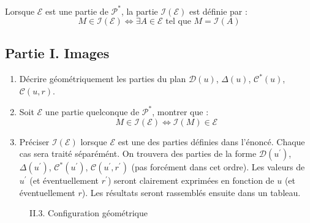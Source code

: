 Lorsque $\mathcal E$ est une partie de $\mathcal P^*$, la partie $\mathcal I(\mathcal E)$ est définie par :
\begin{displaymath}
 M \in \mathcal I(\mathcal E) \Leftrightarrow \exists A\in \mathcal E \text{ tel que } M=\mathcal I(A)
\end{displaymath}

\subsection*{Partie I. Images}
\begin{enumerate}
 \item Décrire géométriquement les parties du plan $\mathcal D(u)$, $\Delta(u)$, $\mathcal C^*(u)$, $\mathcal C(u,r)$.
\item Soit $\mathcal E$ une partie quelconque de $\mathcal P^*$, montrer que :
\begin{displaymath}
 M \in \mathcal I(\mathcal E) \Leftrightarrow  \mathcal I(M)\in \mathcal E
\end{displaymath}

\item Préciser $\mathcal I(\mathcal E)$ lorsque $\mathcal E$ est une des parties définies dans l'énoncé.\newline
Chaque cas sera traité séparémént. On trouvera des parties de la forme $\mathcal D(u^\prime)$, $\Delta(u^\prime)$, $\mathcal C^*(u^\prime)$, $\mathcal C(u^\prime, r^\prime)$ (pas forcément dans cet ordre).\newline
Les valeurs de $u^\prime$ (et éventuellement $r^\prime$) seront clairement exprimées en fonction de $u$ (et éventuellement $r$). Les résultats seront rassemblés ensuite dans un tableau.
\end{enumerate}

 
\begin{figure}
 \centering
 
 \caption{II.3. Configuration géométrique}
 \label{fig:Einv_1}
\end{figure}

